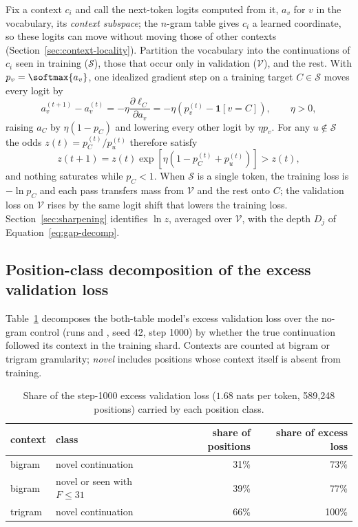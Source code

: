 Fix a context $c_i$ and call the next-token logits computed from it, $a_v$ for $v$ in the vocabulary, its \emph{context subspace}; the $n$-gram table gives $c_i$ a learned coordinate, so these logits can move without moving those of other contexts (Section~\ref{sec:context-locality}). Partition the vocabulary into the continuations of $c_i$ seen in training ($\mathcal{S}$), those that occur only in validation ($\mathcal{V}$), and the rest. With $p_v=\softmax{a_v}$, one idealized gradient step on a training target $C\in\mathcal{S}$ moves every logit by
\begin{equation}
a_v^{(t+1)}-a_v^{(t)}=-\eta\frac{\partial\ell_C}{\partial a_v}=-\eta\left(p_v^{(t)}-\mathbf{1}[v=C]\right),\qquad \eta>0,
\label{eq:av}
\end{equation}
raising $a_C$ by $\eta(1-p_C)$ and lowering every other logit by $\eta p_v$. For any $u\notin\mathcal{S}$ the odds $z(t)=p_C^{(t)}/p_u^{(t)}$ therefore satisfy
\begin{equation}
z(t+1)=z(t)\exp\!\left[\eta\left(1-p_C^{(t)}+p_u^{(t)}\right)\right]>z(t),
\label{eq:zt}
\end{equation}
and nothing saturates while $p_C<1$. When $\mathcal{S}$ is a single token, the training loss is $-\ln p_C$ and each pass transfers mass from $\mathcal{V}$ and the rest onto $C$; the validation loss on $\mathcal{V}$ rises by the same logit shift that lowers the training loss. Section~\ref{sec:sharpening} identifies $\ln z$, averaged over $\mathcal{V}$, with the depth $D_j$ of Equation~\eqref{eq:gap-decomp}.

\subsection{Position-class decomposition of the excess validation loss}
\label{app:novel-share}

Table~\ref{tab:novel-share} decomposes the both-table model's excess validation loss over the no-gram control (runs  and , seed 42, step 1000) by whether the true continuation followed its context in the training shard. Contexts are counted at bigram or trigram granularity; \emph{novel} includes positions whose context itself is absent from training.

\begin{table}[!htbp]
\centering\small
\caption{Share of the step-1000 excess validation loss ($1.68$ nats per token, 589{,}248 positions) carried by each position class.}
\label{tab:novel-share}
\begin{tabular}{llrr}
\toprule
context & class & share of positions & share of excess loss \\
\midrule
bigram & novel continuation & 31\% & 73\% \\
bigram & novel or seen with $F\le 31$ & 39\% & 77\% \\
trigram & novel continuation & 66\% & 100\% \\
\bottomrule
\end{tabular}
\end{table}

